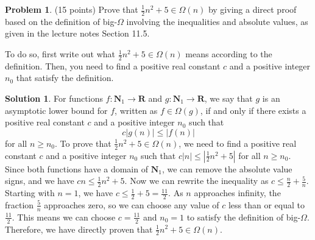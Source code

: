 \documentclass{article}
\theoremstyle{definition}
\newtheorem{problem}{Problem}
\newtheorem*{solution}{Solution}
\newcommand{\N}{\mathbf{N}}
\newcommand{\R}{\mathbf{R}}
\begin{document}
\newpage
\begin{problem} (15 points) 
Prove that $\frac{1}{2}n^2+5 \in \Omega(n)$ by giving a direct proof based on the 
definition of big-$\Omega$ involving the inequalities and absolute values, as given 
in the lecture notes Section 11.5.

To do so, first write out what $\frac{1}{2}n^2+5 \in \Omega(n)$ means according 
to the definition. Then, you need to find a positive real constant $c$ and a positive 
integer $n_0$ that satisfy the definition.
\end{problem}
\begin{solution}
For functions $f: \N_1 \to \R$ and $g: \N_1 \to \R$, we say that $g$ is an asymptotic lower bound for $f$,
written as $f \in \Omega(g)$, if and only if there exists a positive real constant $c$ and a positive integer $n_0$
such that $$ c|g(n)| \leq |f(n)| $$ for all $n \geq n_0$.
To prove that $\frac{1}{2}n^2 + 5 \in \Omega(n)$, we need to find a positive real constant $c$ and a positive integer $n_0$
such that $c|n| \leq |\frac{1}{2}n^2 + 5|$ for all $n \geq n_0$.
Since both functions have a domain of $\N_1$, we can remove the absolute value signs, and we have $cn \leq \frac{1}{2}n^2 + 5$.
Now we can rewrite the inequality as $c \leq \frac{n}{2} + \frac{5}{n}$.
Starting with $n = 1$, we have $c \leq \frac{1}{2} + 5 = \frac{11}{2}$.
As $n$ approaches infinity, the fraction $\frac{5}{n}$ approaches zero, so we can choose any value of $c$ less than or equal to $\frac{11}{2}$.
This means we can choose $c = \frac{11}{2}$ and $n_0 = 1$ to satisfy the definition of big-$\Omega$.
Therefore, we have directly proven that $\frac{1}{2}n^2 + 5 \in \Omega(n)$.
\end{solution}
\end{document}
